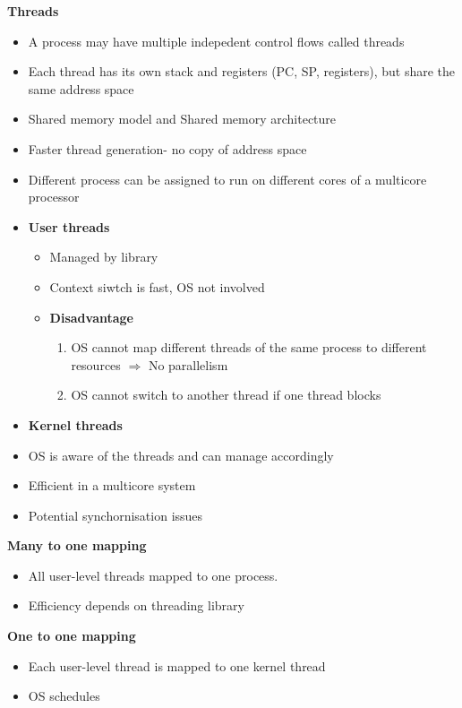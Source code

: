 \documentclass[10pt, landscape]{article}
\begin{document}
\begin{multicols}{4}
\textbf{Threads}
\begin{itemize}
    \item A process may have multiple indepedent control flows called threads 
    \item Each thread has its own stack and registers (PC, SP, registers), but share the same address space 
    \item Shared memory model and Shared memory architecture
    \item Faster thread generation- no copy of  address space
    \item Different process can be assigned to run on different cores of a multicore processor
    \item \textbf{User threads}
    \begin{itemize}
        \item Managed by library 
        \item Context siwtch is fast, OS not involved
        \item \textbf{Disadvantage}
        \begin{enumerate}
            \item OS cannot map different threads of the same process to different resources $\Rightarrow$ No parallelism
            \item OS cannot switch to another thread if one thread blocks
        \end{enumerate} 
    \end{itemize}
    \item \textbf{Kernel threads}
    \item OS is aware of the threads and can manage accordingly
    \item Efficient in a multicore system
    \item Potential synchornisation issues
\end{itemize}

\textbf{Many to one mapping}
\begin{itemize}
    \item All user-level threads mapped to one process. 
    \item Efficiency depends on threading library
\end{itemize}

\textbf{One to one mapping}
\begin{itemize}
    \item Each user-level thread is mapped to one kernel thread
    \item OS schedules 
\end{itemize}


\end{multicols}
\end{document}
